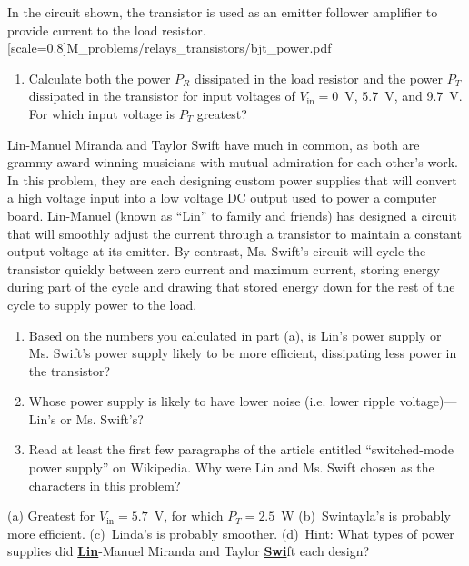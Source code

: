 \pagebreak[4]
\begin{Exercise}
\label{prob_Linda_Swintayla}
In the circuit shown, the transistor is used as an emitter follower amplifier to provide current to the load resistor.  
[scale=0.8]{M_problems/relays_transistors/bjt_power.pdf}{
\begin{enumerate}[nosep, label=(\alph*)]
\item Calculate both the power $P_R$ dissipated in the load resistor and the power $P_T$ dissipated in the transistor for input voltages of $V_\text{in}= 0$~V, 5.7~V, and 9.7~V.  For which input voltage is $P_T$ greatest?
\end{enumerate}

\medskip
Lin-Manuel Miranda and Taylor Swift have much in common, as both are grammy-award-winning musicians with mutual admiration for each other's work.  In this problem, they are each designing custom power supplies that will convert a high voltage input into a low voltage DC output used to power a computer board.  Lin-Manuel (known as ``Lin'' to family and friends) has designed a circuit that will smoothly adjust the current through a transistor to maintain a constant output voltage at its emitter.  By contrast, Ms. Swift's circuit will cycle the transistor quickly between zero current and maximum current, storing energy during part of the cycle and drawing that stored energy down for the rest of the cycle to supply power to the load.  
}
\begin{enumerate}[nosep, label=(\alph*),nosep,start=2]
\item Based on the numbers you calculated in part (a), is Lin's power supply or Ms. Swift's power supply likely to be more efficient, dissipating less power in the transistor?  
\item Whose power supply is likely to have lower noise (i.e. lower ripple voltage)---Lin's or Ms. Swift's?  
\item Read at least the first few paragraphs of the article entitled ``switched-mode power supply'' on Wikipedia.  Why were Lin and Ms. Swift chosen as the characters in this problem?
\end{enumerate}
\end{Exercise}
\begin{Answer}
(a) Greatest for 
$V_\text{in}=5.7$~V, for which $P_T=2.5$~W 
(b)~Swintayla's is probably more efficient.  
(c)~Linda's is probably smoother.  
(d)~Hint: What types of power supplies did \textbf{\underline{Lin}}-Manuel Miranda and Taylor \underline{\textbf{Swi}}ft each design?
\end{Answer}

